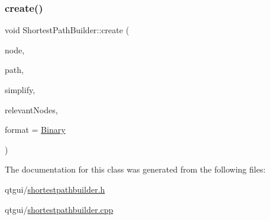 \subsubsection{\texorpdfstring{create()}{create()}}
{\footnotesize\ttfamily void Shortest\+Path\+Builder\+::create (\begin{DoxyParamCaption}\item[{std\+::shared\+\_\+ptr$<$ \mbox{\hyperlink{class_node_data}{Node\+Data}} $>$}]{node,  }\item[{Q\+String}]{path,  }\item[{bool}]{simplify,  }\item[{const Q\+List$<$ std\+::shared\+\_\+ptr$<$ \mbox{\hyperlink{class_node_data}{Node\+Data}} $>$ $>$ \&}]{relevant\+Nodes,  }\item[{\mbox{\hyperlink{class_shortest_path_builder_afd1e54ec63b4266aed503c6fb3bb7a73}{Format}}}]{format = {\ttfamily \mbox{\hyperlink{class_shortest_path_builder_afd1e54ec63b4266aed503c6fb3bb7a73adfe54cf287abea5248d8b43f1cde7860}{Binary}}} }\end{DoxyParamCaption})}



The documentation for this class was generated from the following files\+:\begin{DoxyCompactItemize}
\item 
qtgui/\mbox{\hyperlink{shortestpathbuilder_8h}{shortestpathbuilder.\+h}}\item 
qtgui/\mbox{\hyperlink{shortestpathbuilder_8cpp}{shortestpathbuilder.\+cpp}}\end{DoxyCompactItemize}
